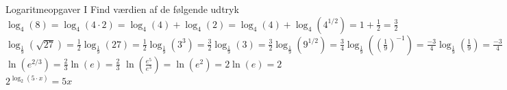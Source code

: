 %    
%    
%   
%   
%   


\begin{opgave}{Logaritmeopgaver I}
    Find værdien af de følgende udtryk
    \opg $\log_4(8) = \log_4(4\cdot 2)=\log_4(4)+\log_4(2)=\log_4(4)+\log_4(4^{1/2})=1+\frac{1}{2}=\frac{3}{2}$
    \opg $\log_\frac{1}{9} \left(\sqrt{27}\right)=\frac{1}{2}\log_\frac{1}{9}\left(27\right)=\frac{1}{2}\log_\frac{1}{9}\left(3^3\right)=\frac{3}{2}\log_\frac{1}{9}\left(3\right)=\frac{3}{2}\log_\frac{1}{9}\left(9^{1/2}\right)=\frac{3}{4}\log_\frac{1}{9}\left(\left(\frac{1}{9}\right)^{-1}\right)=\frac{-3}{4}\log_\frac{1}{9}\left(\frac{1}{9}\right)=\frac{-3}{4}$
    \opg $\ln(e^{2/3})=\frac{2}{3}\ln(e)=\frac{2}{3}$
    \opg $\ln(\frac{e^5}{e^3})=\ln(e^2)=2\ln(e)=2$
    \opg $2^{\log_2(5 \cdot x)}=5x$
\end{opgave}

